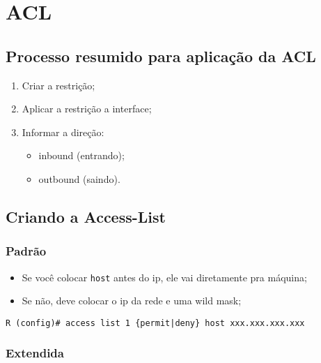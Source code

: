 \documentclass[]{article}
\date{}
\providecommand{\tightlist}{%
  \setlength{\itemsep}{0pt}\setlength{\parskip}{0pt}}
\begin{document}
{
\setcounter{tocdepth}{3}
\tableofcontents
}
\hypertarget{acl}{%
\section{ACL}\label{acl}}

\hypertarget{processo-resumido-para-aplicauxe7uxe3o-da-acl}{%
\subsection{Processo resumido para aplicação da
ACL}\label{processo-resumido-para-aplicauxe7uxe3o-da-acl}}

\begin{enumerate}
\def\labelenumi{\arabic{enumi}.}
\item
  Criar a restrição;
\item
  Aplicar a restrição a interface;
\item
  Informar a direção:

  \begin{itemize}
  \tightlist
  \item
    inbound (entrando);
  \item
    outbound (saindo).
  \end{itemize}
\end{enumerate}

\hypertarget{criando-a-access-list}{%
\subsection{Criando a Access-List}\label{criando-a-access-list}}

\hypertarget{padruxe3o}{%
\subsubsection{Padrão}\label{padruxe3o}}

\begin{itemize}
\item
  Se você colocar \texttt{host} antes do ip, ele vai diretamente pra
  máquina;
\item
  Se não, deve colocar o ip da rede e uma wild mask;
\end{itemize}

\begin{verbatim}
R (config)# access list 1 {permit|deny} host xxx.xxx.xxx.xxx
\end{verbatim}

\hypertarget{extendida}{%
\subsubsection{Extendida}\label{extendida}}
\end{document}
